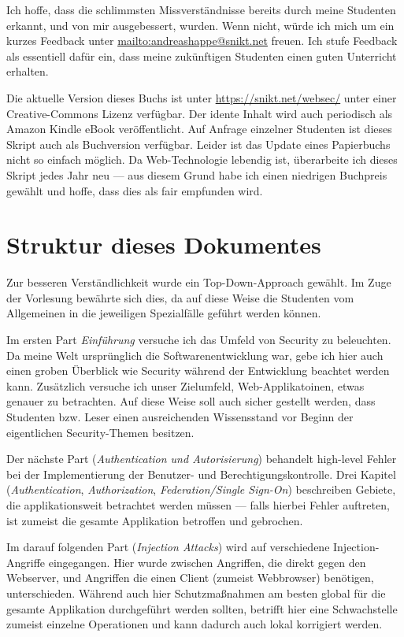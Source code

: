 Ich hoffe, dass die schlimmsten Missverständnisse bereits durch meine Studenten erkannt, und von mir ausgebessert, wurden. Wenn nicht, würde ich mich um ein kurzes Feedback unter \url{mailto:andreashappe@snikt.net} freuen. Ich stufe Feedback als essentiell dafür ein, dass meine zukünftigen Studenten einen guten Unterricht erhalten.

Die aktuelle Version dieses Buchs ist unter \url{https://snikt.net/websec/} unter einer Creative-Commons Lizenz verfügbar. Der idente Inhalt wird auch periodisch als Amazon Kindle eBook veröffentlicht. Auf Anfrage einzelner Studenten ist dieses Skript auch als Buchversion verfügbar. Leider ist das Update eines Papierbuchs nicht so einfach möglich. Da Web-Technologie lebendig ist, überarbeite ich dieses Skript jedes Jahr neu --- aus diesem Grund habe ich einen niedrigen Buchpreis gewählt und hoffe, dass dies als fair empfunden wird.

\section{Struktur dieses Dokumentes}

Zur besseren Verständlichkeit wurde ein Top-Down-Approach gewählt. Im Zuge der Vorlesung bewährte sich dies, da auf diese Weise die Studenten vom Allgemeinen in die jeweiligen Spezialfälle geführt werden können.

Im ersten Part \textit{Einführung} versuche ich das Umfeld von Security zu beleuchten. Da meine Welt ursprünglich die Softwarenentwicklung war, gebe ich hier auch einen groben Überblick wie Security während der Entwicklung beachtet werden kann. Zusätzlich versuche ich unser Zielumfeld, Web-Applikatoinen, etwas genauer zu betrachten. Auf diese Weise soll auch sicher gestellt werden, dass Studenten bzw. Leser einen ausreichenden Wissensstand vor Beginn der eigentlichen Security-Themen besitzen.

Der nächste Part (\textit{Authentication und Autorisierung}) behandelt high-level Fehler bei der Implementierung der Benutzer- und Berechtigungskontrolle. Drei Kapitel (\textit{Authentication}, \textit{Authorization}, \textit{Federation/Single Sign-On}) beschreiben Gebiete, die applikationsweit betrachtet werden müssen --- falls hierbei Fehler auftreten, ist zumeist die gesamte Applikation betroffen und gebrochen.

Im darauf folgenden Part (\textit{Injection Attacks}) wird auf verschiedene Injection-Angriffe eingegangen. Hier wurde zwischen Angriffen, die direkt gegen den Webserver, und Angriffen die einen Client (zumeist Webbrowser) benötigen, unterschieden. Während auch hier Schutzmaßnahmen am besten global für die gesamte Applikation durchgeführt werden sollten, betrifft hier eine Schwachstelle zumeist einzelne Operationen und kann dadurch auch lokal korrigiert werden.

